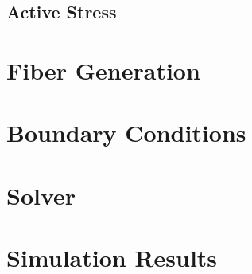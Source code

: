 \subsection{Active Stress}
\label{Active Stress}

\section{Fiber Generation}
\label{Fiber Generation}

\section{Boundary Conditions}
\label{Boundary Conditions}

\section{Solver}
\label{Solver}

\section{Simulation Results}
\label{Simulation Results}
